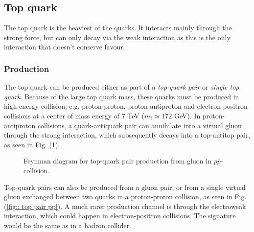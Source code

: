 \documentclass[11pt]{article}
\begin{document}
\begin{multicols}{2}
\subsection*{Top quark}

\begin{flushleft}
The top quark is the heaviest of the quarks. It interacts mainly through the strong force, but can only decay via the weak interaction as this is the only interaction that doesn't conserve favour.
\end{flushleft}

\subsubsection*{Production}
\begin{flushleft}
The top quark can be produced either as part of a \textit{top-quark pair} or \textit{single top quark}. Because of the large top quark mass, these quarks must be produced in high energy collision, e.g. proton-proton, proton-antiproton and electron-positron collisions at a center of mass energy of $7$ TeV ($m_t \simeq 172$ GeV). In proton-antiproton collisions, a quark-antiquark pair can annihilate into a virtual gluon through the strong interaction, which subsequently decays into a top-antitop pair, as seen in Fig. (\ref{fig:: top pair gluon}).  
\begin{figure}[H]
\centering
{}
\caption{Feynman diagram for top-quark pair production from gluon in $p \bar{p}$-collision.}
\label{fig:: top pair gluon}
\end{figure}
Top-quark pairs can also be produced from a gluon pair, or from a single virtual gluon exchanged between two quarks in a proton-proton collision, as seen in Fig. (\ref{fig:: top pair pp}). A much rarer production channel is through the electroweak interaction, which could happen in electron-positron collisions. The signature would be the same as in a hadron collider.
\begin{figure}[H]

\end{figure}
\end{flushleft}
\end{multicols}
\end{document}
